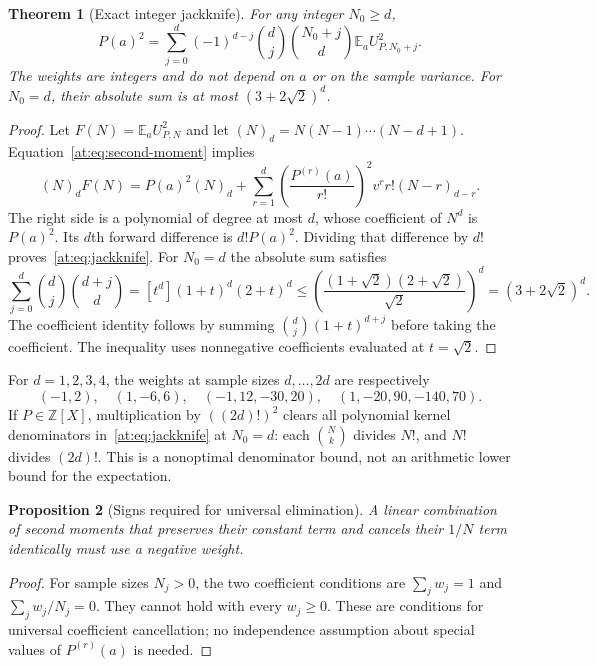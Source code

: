 \documentclass[11pt,a4paper]{article}
\newcommand{\Z}{\mathbb Z}
\newcommand{\E}{\mathbb E}
\newtheorem{theorem}{Theorem}[section]
\newtheorem{proposition}[theorem]{Proposition}
\theoremstyle{definition}
\theoremstyle{remark}
\numberwithin{equation}{section}
\begin{document}
\begin{theorem}[Exact integer jackknife]
\label{at:sta:jackknife}
For any integer $N_0\ge d$,
\begin{equation}
 P(a)^2=\sum_{j=0}^d(-1)^{d-j}\binom dj\binom{N_0+j}d
 \E_a U_{P,N_0+j}^2.
 \label{at:eq:jackknife}
\end{equation}
The weights are integers and do not depend on $a$ or on the sample
variance. For $N_0=d$, their absolute sum is at most
$(3+2\sqrt2)^d$.
\end{theorem}
\begin{proof}
Let $F(N)=\E_aU_{P,N}^2$ and let $(N)_d=N(N-1)\cdots(N-d+1)$.
Equation~\eqref{at:eq:second-moment} implies
\[
 (N)_dF(N)=P(a)^2(N)_d+
 \sum_{r=1}^d\left(\frac{P^{(r)}(a)}{r!}\right)^2
 v^r r!(N-r)_{d-r}.
\]
The right side is a polynomial of degree at most $d$, whose coefficient
of $N^d$ is $P(a)^2$. Its $d$th forward difference is $d!P(a)^2$.
Dividing that difference by $d!$ proves~\eqref{at:eq:jackknife}.
For $N_0=d$ the absolute sum satisfies
\[
 \sum_{j=0}^d\binom dj\binom{d+j}d
 =[t^d](1+t)^d(2+t)^d
 \le\left(\frac{(1+\sqrt2)(2+\sqrt2)}{\sqrt2}\right)^d
 =(3+2\sqrt2)^d.
\]
The coefficient identity follows by summing
$\binom dj(1+t)^{d+j}$ before taking the coefficient. The inequality
uses nonnegative coefficients evaluated at $t=\sqrt2$.
\end{proof}

For $d=1,2,3,4$, the weights at sample sizes $d,\ldots,2d$ are
respectively
\[
 (-1,2),\quad(1,-6,6),\quad(-1,12,-30,20),\quad
 (1,-20,90,-140,70).
\]
If $P\in\Z[X]$, multiplication by $((2d)!)^2$ clears all polynomial
kernel denominators in~\eqref{at:eq:jackknife} at $N_0=d$:
each $\binom Nk$ divides $N!$, and $N!$ divides $(2d)!$.
This is a nonoptimal denominator bound, not an arithmetic lower bound
for the expectation.

\begin{proposition}[Signs required for universal elimination]
\label{at:sta:signs}
A linear combination of second moments that preserves their constant
term and cancels their $1/N$ term identically must use a negative weight.
\end{proposition}
\begin{proof}
For sample sizes $N_j>0$, the two coefficient conditions are
$\sum_jw_j=1$ and $\sum_jw_j/N_j=0$. They cannot hold with every
$w_j\ge0$. These are conditions for universal coefficient cancellation;
no independence assumption about special values of $P^{(r)}(a)$ is needed.
\end{proof}
\end{document}

